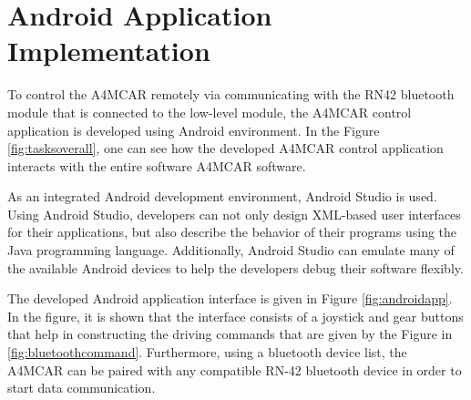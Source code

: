 \section{Android Application Implementation}
To control the A4MCAR remotely via communicating with the RN42 bluetooth module that is connected to the low-level module, the A4MCAR control application is developed using Android \cite{androidwebsite} environment. In the Figure \ref{fig:tasksoverall}, one can see how the developed A4MCAR control application interacts with the entire software A4MCAR software.

As an integrated Android development environment, Android Studio \cite{androidstudio} is used. Using Android Studio, developers can not only design XML-based user interfaces for their applications, but also describe the behavior of their programs using the Java programming language. Additionally, Android Studio can emulate many of the available Android devices to help the developers debug their software flexibly.

The developed Android application interface is given in Figure \ref{fig:androidapp}. In the figure, it is shown that the interface consists of a joystick and gear buttons that help in constructing the driving commands that are given by the Figure in \ref{fig:bluetoothcommand}. Furthermore, using a bluetooth device list, the A4MCAR can be paired with any compatible RN-42 bluetooth device in order to start data communication.

